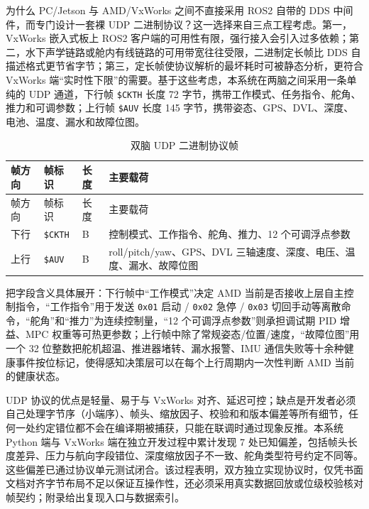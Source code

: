为什么 PC/Jetson 与 AMD/VxWorks 之间不直接采用 ROS2 自带的 DDS 中间件，而专门设计一套裸 UDP 二进制协议？这一选择来自三点工程考虑。第一，VxWorks 嵌入式板上 ROS2 客户端的可用性有限，强行接入会引入过多依赖；第二，水下声学链路或舱内有线链路的可用带宽往往受限，二进制定长帧比 DDS 自描述格式更节省字节；第三，定长帧使协议解析的最坏耗时可被静态分析，更符合 VxWorks 端``实时性下限''的需要。基于这些考虑，本系统在两脑之间采用一条单纯的 UDP 通道，下行帧 \texttt{\$CKTH} 长度 72 字节，携带工作模式、任务指令、舵角、推力和可调参数；上行帧 \texttt{\$AUV} 长度 145 字节，携带姿态、GPS、DVL、深度、电池、温度、漏水和故障位图。

\begin{longtable}[]{@{}
  >{\raggedright\arraybackslash}p{}
  >{\raggedright\arraybackslash}p{}
  >{\raggedright\arraybackslash}p{}
  >{\raggedright\arraybackslash}p{}@{}}
\caption{双脑 UDP 二进制协议帧}\label{tab:ch02-udp-frames}\tabularnewline
\toprule\noalign{}
帧方向 & 帧标识 & 长度 & 主要载荷 \\
\midrule\noalign{}
\endfirsthead
\toprule\noalign{}
帧方向 & 帧标识 & 长度 & 主要载荷 \\
\midrule\noalign{}
\endhead
\bottomrule\noalign{}
\endlastfoot
下行 & \texttt{\$CKTH} & 72 B & 控制模式、工作指令、舵角、推力、12 个可调浮点参数 \\
上行 & \texttt{\$AUV} & 145 B & roll/pitch/yaw、GPS、DVL 三轴速度、深度、电压、温度、漏水、故障位图 \\
\end{longtable}

把字段含义具体展开：下行帧中``工作模式''决定 AMD 当前是否接收上层自主控制指令，``工作指令''用于发送 \texttt{0x01} 启动 / \texttt{0x02} 急停 / \texttt{0x03} 切回手动等离散命令，``舵角''和``推力''为连续控制量，``12 个可调浮点参数''则承担调试期 PID 增益、MPC 权重等可热更参数；上行帧中除了常规姿态/位置/速度，``故障位图''用一个 32 位整数把舵机超温、推进器堵转、漏水报警、IMU 通信失败等十余种健康事件按位标记，使得感知决策层可以在每个上行周期内一次性判断 AMD 当前的健康状态。

UDP 协议的优点是轻量、易于与 VxWorks 对齐、延迟可控；缺点是开发者必须自己处理字节序（小端序）、帧头、缩放因子、校验和和版本偏差等所有细节，任何一处约定错位都不会在编译期被捕获，只能在联调时通过现象反推。本系统 Python 端与 VxWorks 端在独立开发过程中累计发现 7 处已知偏差，包括帧头长度差异、压力与航向字段错位、深度缩放因子不一致、舵角类型符号约定不同等。这些偏差已通过协议单元测试闭合。该过程表明，双方独立实现协议时，仅凭书面文档对齐字节布局不足以保证互操作性，还必须采用真实数据回放或位级校验核对帧契约；附录给出复现入口与数据索引。

